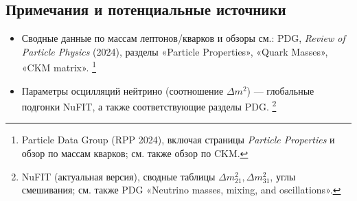 \subsection{Примечания и потенциальные источники}
\begin{itemize}
  \item Сводные данные по массам лептонов/кварков и обзоры см.: 
  PDG, \emph{Review of Particle Physics} (2024), разделы «Particle Properties», «Quark Masses», «CKM matrix».%
  \footnote{Particle Data Group (RPP 2024), включая страницы \emph{Particle Properties} и обзор по массам кварков; см. также обзор по CKM.}
  \item Параметры осцилляций нейтрино (соотношение \(\Delta m^2\)) — глобальные подгонки NuFIT, а также соответствующие разделы PDG.%
  \footnote{NuFIT (актуальная версия), сводные таблицы \(\Delta m^2_{21}, \Delta m^2_{31}\), углы смешивания; см. также PDG «Neutrino masses, mixing, and oscillations».}
\end{itemize}
